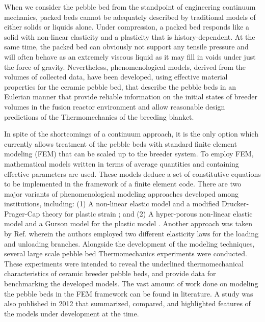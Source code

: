 When we consider the pebble bed from the standpoint of engineering continuum mechanics, packed beds cannot be adequately described by traditional models of either solids or liquids alone. Under compression, a packed bed responds like a solid with non-linear elasticity and a plasticity that is history-dependent. At the same time, the packed bed can obviously not support any tensile pressure and will often behave as an extremely viscous liquid as it may fill in voids under just the force of gravity. Nevertheless, phenomenological models, derived from the volumes of collected data, have been developed, using effective material properties for the ceramic pebble bed, that describe the pebble beds in an Eulerian manner that provide reliable information on the initial states of breeder volumes in the fusion reactor environment and allow reasonable design predictions of the Thermomechanics of the breeding blanket. 

In spite of the shortcomings of a continuum approach, it is the only option which currently allows treatment of the pebble beds with standard finite element modeling (FEM) that can be scaled up to the breeder system. To employ FEM, mathematical models written in terms of average quantities and containing effective parameters are used. These models deduce a set of constitutive equations to be implemented in the framework of a finite element code.  There are two major variants of phenomenological modeling approaches developed among institutions, including: (1) A non-linear elastic model and a modified Drucker-Prager-Cap theory for plastic strain \cite{Gan2007189,fokkens2003}; and (2) A hyper-porous non-linear elastic model and a Gurson model for the plastic model \cite{DellOrco:2007hc,DellOrco:2010zr,DiMaio20081287}. Another approach was taken by Ref.\cite{fokkens2003} wherein the authors employed two different elasticity laws for the loading and unloading branches. Alongside the development of the modeling techniques, several large scale pebble bed Thermomechanics experiments were conducted. These experiments were intended to reveal the underlined thermomechanical characteristics of ceramic breeder pebble beds, and provide data for benchmarking the developed models. The vast amount of work done on modeling the pebble beds in the FEM framework can be found in literature. \cite{DellOrco:2007hc,DellOrco:2010zr,DiMaio20101234,Gan2007189,Gan2007189,Gan:2009vn,Gan:2010lh,Gan:2010kc,DellOrco:2007hc,DellOrco:2010zr,DiMaio20101234,Gan2007189,DellOrco:2007hc,DiMaio20101234} A study was also published in 2012 that summarized, compared, and highlighted features of the models under development at the time.\cite{ying2011isfnt}

